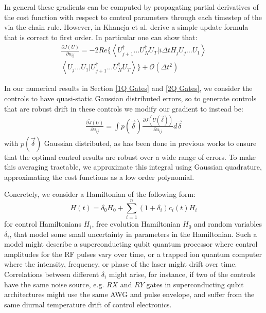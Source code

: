 \documentclass[aps,nofootinbib,pra,notitlepage,twocolumn]{revtex4-1}
\newcommand{\braket}[2]{\left\langle #1 | #2 \right\rangle}
\begin{document}
In general these gradients can be computed by propagating partial derivatives of the cost function with respect to control parameters through each timestep of the  via the chain rule. However, in \cite{Khaneja2005} Khaneja et al. derive a simple update formula that is correct to first order. In particular one can show that:
\begin{equation}\label{eq:update}
  \begin{split}
\frac{\partial J(U)}{\partial u_{ij}} = -2Re\{\braket{{U_{j+1}^{\dagger}...U_N^{\dagger} U_T}}{i\Delta tH_jU_j...U_1}\\
\braket{U_j...U_1}{U_{j+1}^{\dagger}...U_N^{\dagger} U_T}\} +  \mathcal{O}(\Delta t^2)
  \end{split}
\end{equation}


In our numerical results in Section \ref{1Q Gates} and \ref{2Q Gates}, we consider the controls to have quasi-static Gaussian distributed errors, so to generate controls that are robust drift in these controls we modify our gradient to instead be:
\begin{align}\label{quadrature}
\frac{\partial \tilde J(U)}{\partial u_{ij}} =
\int p(\vec{\delta})\frac{\partial J(U(\vec{\delta}))}{\partial u_{ij}} d\vec{\delta}
\end{align}
with $p(\vec{\delta})$ Gaussian distributed, as has been done in previous works \cite{Goerz2014} to ensure that the optimal control results are robust over a wide range of errors. To make this averaging tractable, we approximate this integral using Gaussian quadrature, approximating the cost functions as a low order polynomial. 

Concretely, we consider a Hamiltonian of the following form:
\begin{equation}\label{eq:2}
  H(t) = \delta_0H_0 + \sum_{i=1}^n (1 + \delta_i)c_i(t)H_i
\end{equation}
for control Hamiltonians $H_i$, free evolution Hamiltonian $H_0$ and random variables $\delta_i$, that model some small uncertainty in parameters in the Hamiltonian. Such a model might describe a superconducting qubit quantum processor where control amplitudes for the RF pulses vary over time, or a trapped ion quantum computer where the intensity, frequency, or phase of the laser might drift over time\cite{Kelly2018, Lekitsch2017}. Correlations between different $\delta_i$ might arise, for instance, if two of the controls have the same noise source, e.g. $RX$ and $RY$ gates in superconducting qubit architectures might use the same AWG and pulse envelope, and suffer from the same diurnal temperature drift of control electronics.
\end{document}

